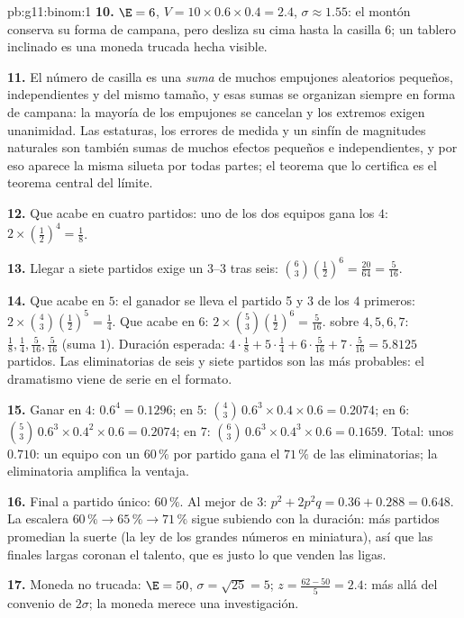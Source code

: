 \begin{solution}{pb:g11:binom:1}
\textbf{10.} $\E = 6$, $V = 10 \times 0.6 \times 0.4 = 2.4$,
$\sigma \approx 1.55$: el montón conserva su forma de campana, pero
desliza su cima hasta la casilla $6$; un tablero inclinado es una moneda
trucada hecha visible.

\textbf{11.} El número de casilla es una \emph{suma} de muchos empujones
aleatorios pequeños, independientes y del mismo tamaño, y esas sumas se
organizan siempre en forma de campana: la mayoría de los empujones se
cancelan y los extremos exigen unanimidad. Las estaturas, los errores de
medida y un sinfín de magnitudes naturales son también sumas de muchos
efectos pequeños e independientes, y por eso aparece la misma silueta por
todas partes; el teorema que lo certifica es el teorema central del
límite.

\textbf{12.} Que acabe en cuatro partidos: uno de los dos equipos gana los
$4$: $2 \times \left(\frac12\right)^4 = \frac18$.

\textbf{13.} Llegar a siete partidos exige un $3$--$3$ tras seis:
$\binom63 \left(\frac12\right)^6 = \frac{20}{64} = \frac{5}{16}$.

\textbf{14.} Que acabe en $5$: el ganador se lleva el partido 5 y $3$ de
los $4$ primeros: $2 \times \binom43 \left(\frac12\right)^5 = \frac14$.
Que acabe en $6$: $2 \times \binom53 \left(\frac12\right)^6 =
\frac{5}{16}$.  sobre $4, 5, 6, 7$:
$\frac18, \frac14, \frac{5}{16}, \frac{5}{16}$ (suma $1$). Duración
esperada: $4 \cdot \frac18 + 5 \cdot \frac14 + 6 \cdot \frac{5}{16} +
7 \cdot \frac{5}{16} = 5.8125$ partidos. Las eliminatorias de seis y siete
partidos son las más probables: el dramatismo viene de serie en el
formato.

\textbf{15.} Ganar en $4$: $0.6^4 = 0.1296$; en $5$:
$\binom43\,0.6^3 \times 0.4 \times 0.6 = 0.2074$; en $6$:
$\binom53\,0.6^3 \times 0.4^2 \times 0.6 = 0.2074$; en $7$:
$\binom63\,0.6^3 \times 0.4^3 \times 0.6 = 0.1659$. Total: unos $0.710$:
un equipo con un $60\,\%$ por partido gana el $71\,\%$ de las
eliminatorias; la eliminatoria amplifica la ventaja.

\textbf{16.} Final a partido único: $60\,\%$. Al mejor de $3$:
$p^2 + 2p^2 q = 0.36 + 0.288 = 0.648$. La escalera
$60\,\% \to 65\,\% \to 71\,\%$ sigue subiendo con la duración: más
partidos promedian la suerte (la ley de los grandes números en miniatura),
así que las finales largas coronan el talento, que es justo lo que venden
las ligas.

\textbf{17.} Moneda no trucada: $\E = 50$, $\sigma = \sqrt{25} = 5$;
$z = \frac{62 - 50}{5} = 2.4$: más allá del convenio de $2\sigma$; la
moneda merece una investigación.


\end{solution}
